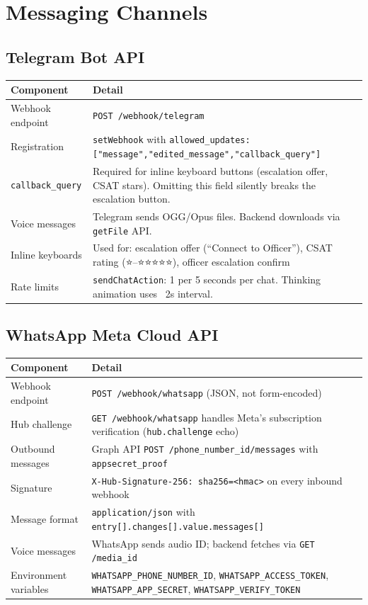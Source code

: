 \documentclass[12pt,a4paper]{article}
\begin{document}
\section{Messaging Channels}
\label{sec:channels}

\subsection{Telegram Bot API}

\begin{tabular}{@{}lp{10cm}@{}}
\toprule
\textbf{Component} & \textbf{Detail} \\
\midrule
Webhook endpoint   & \texttt{POST /webhook/telegram} \\
Registration       & \texttt{setWebhook} with \texttt{allowed\_updates: ["message","edited\_message","callback\_query"]} \\
\texttt{callback\_query} & Required for inline keyboard buttons (escalation offer, CSAT stars). Omitting this field silently breaks the escalation button. \\
Voice messages     & Telegram sends OGG/Opus files. Backend downloads via \texttt{getFile} API. \\
Inline keyboards   & Used for: escalation offer (``Connect to Officer''), CSAT rating (⭐–⭐⭐⭐⭐⭐), officer escalation confirm \\
Rate limits        & \texttt{sendChatAction}: 1 per 5 seconds per chat. Thinking animation uses ~2s interval. \\
\bottomrule
\end{tabular}

\subsection{WhatsApp Meta Cloud API}

\begin{tabular}{@{}lp{10cm}@{}}
\toprule
\textbf{Component} & \textbf{Detail} \\
\midrule
Webhook endpoint   & \texttt{POST /webhook/whatsapp} (JSON, not form-encoded) \\
Hub challenge      & \texttt{GET /webhook/whatsapp} handles Meta's subscription verification (\texttt{hub.challenge} echo) \\
Outbound messages  & Graph API \texttt{POST /{phone\_number\_id}/messages} with \texttt{appsecret\_proof} \\
Signature          & \texttt{X-Hub-Signature-256: sha256=<hmac>} on every inbound webhook \\
Message format     & \texttt{application/json} with \texttt{entry[].changes[].value.messages[]} \\
Voice messages     & WhatsApp sends audio ID; backend fetches via \texttt{GET /{media\_id}} \\
Environment variables & \texttt{WHATSAPP\_PHONE\_NUMBER\_ID}, \texttt{WHATSAPP\_ACCESS\_TOKEN}, \texttt{WHATSAPP\_APP\_SECRET}, \texttt{WHATSAPP\_VERIFY\_TOKEN} \\
\bottomrule
\end{tabular}
\end{document}
